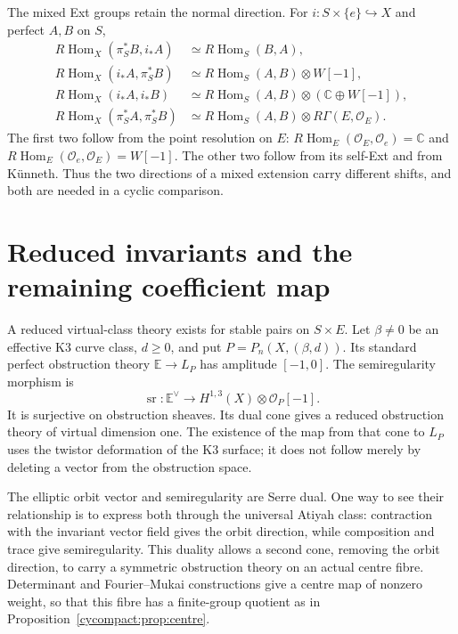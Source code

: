 The mixed Ext groups retain the normal direction.
For $i:S\times\{e\}\hookrightarrow X$ and
perfect $A,B$ on $S$,
\begin{equation}\label{cycompact:eq:mixed-Ext}
\begin{split}
 R\operatorname{Hom}_X(\pi_S^*B,i_*A)
   &\simeq R\operatorname{Hom}_S(B,A),\\
 R\operatorname{Hom}_X(i_*A,\pi_S^*B)
   &\simeq R\operatorname{Hom}_S(A,B)\otimes W[-1],\\
 R\operatorname{Hom}_X(i_*A,i_*B)
   &\simeq R\operatorname{Hom}_S(A,B)
                  \otimes(\mathbb C\oplus W[-1]),\\
 R\operatorname{Hom}_X(\pi_S^*A,\pi_S^*B)
   &\simeq R\operatorname{Hom}_S(A,B)
                  \otimes R\Gamma(E,\mathcal O_E).
\end{split}
\end{equation}
The first two follow from the point resolution
on $E$: $R\operatorname{Hom}_E(\mathcal O_E,\mathcal O_e)
=\mathbb C$ and
$R\operatorname{Hom}_E(\mathcal O_e,\mathcal O_E)
=W[-1]$. The other two follow from its
self-Ext and from K\"unneth. Thus the two
directions of a mixed extension carry
different shifts, and both are needed in a
cyclic comparison.

\section{Reduced invariants and the remaining coefficient map}
\label{cycompact:sec:global-comparison}

A reduced virtual-class theory exists
for stable pairs on $S\times E$.
Let $\beta\ne0$ be an effective K3 curve class,
$d\geq0$, and put $P=P_n(X,(\beta,d))$.
Its standard perfect obstruction theory
$\mathbb E\to L_P$ has amplitude $[-1,0]$.
The semiregularity morphism is
\[
 \operatorname{sr}:\mathbb E^\vee
 \longrightarrow H^{1,3}(X)\otimes\mathcal O_P[-1].
\]
It is surjective on obstruction sheaves. Its
dual cone gives a reduced obstruction theory
of virtual dimension one. The existence of
the map from that cone to $L_P$ uses the
twistor deformation of the K3 surface; it
does not follow merely by deleting a vector
from the obstruction space.

The elliptic orbit vector and semiregularity
are Serre dual. One way to see their
relationship is to express both through the
universal Atiyah class: contraction with
the invariant vector field gives the orbit
direction, while composition and trace give
semiregularity. This duality allows a second
cone, removing the orbit direction, to carry
a symmetric obstruction theory on an actual
centre fibre. Determinant and Fourier--Mukai
constructions give a centre map of nonzero
weight, so that this fibre has a finite-group
quotient as in Proposition~\ref{cycompact:prop:centre}.

